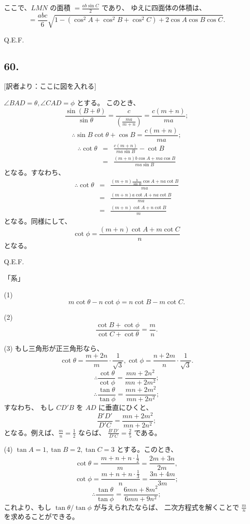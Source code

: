 ここで、$LMN$ の面積 $= \frac{ab \sin C}{2}$ であり、
ゆえに四面体の体積は、
\[
= \frac{abc}{6}
 \sqrt{1 - (\cos^2 A + \cos^2 B + \cos^2 C) + 2 \cos A \cos B \cos C}.
\]

Q.E.F.


\subsection*{60.}

[訳者より：ここに図を入れる] 

$\angle BAD = \theta, \angle CAD = \phi$ とする。
このとき、
\[
\frac{\sin (B + \theta)}{\sin \theta}
= \frac{c}{\left( \frac{ma}{m + n} \right)}
= \frac{c ( m + n)}{ma};
\]
\[
\therefore
\sin B \cot \theta + \cos B = \frac{c(m + n)}{ma};
\]
\begin{eqnarray*}
\therefore
\cot \theta
&=&
 \frac{c(m + n)}{ma \sin B} - \cot B\\
&=&
 \frac{(m+n)b \cos A + ma \cos B}{ma \sin B}
\end{eqnarray*}
となる。すなわち、
\begin{eqnarray*}
\therefore
\cot \theta
&=&
\frac{(m + n) \frac{b}{\sin B} \cos A + na \cot B}{ma}\\
&=&
\frac{(m + n) a \cot A + na \cot B}{ma}\\
&=&
\frac{(m + n)  \cot A + n \cot B}{m}
\end{eqnarray*}
となる。同様にして、
\[
\cot \phi = \frac{(m + n)  \cot A + m \cot C}{n}
\]
となる。

Q.E.F.

「系」

(1)
\[
m \cot \theta - n \cot \phi = n \cot B - m \cot C.
\]

(2)
\[
\frac{\cot B + \cot \phi}{\cot C + \cot \theta} = \frac{m}{n}.
\]

(3)
もし三角形が正三角形なら、
\[
\cot \theta = \frac{m + 2n}{m} \cdot \frac{1}{\sqrt{3}},
\cot \phi = \frac{n + 2m}{n} \cdot \frac{1}{\sqrt{3}}.
\]
\[
\therefore
\frac{\cot \theta}{\cot \phi} = \frac{mn + 2n^2}{mn + 2m^2};
\]
\[
\therefore
\frac{\tan \theta}{\tan \phi} = \frac{mn + 2m^2}{mn + 2n^2};
\]
すなわち、
もし $CD'B$ を $AD$ に垂直にひくと、
\[
\frac{B'D'}{D'C} = \frac{mn + 2m^2}{mn + 2n^2};
\]
となる。例えば、$\frac{m}{n} = \frac{1}{2}$ ならば、
$\frac{B'D'}{D'C} = \frac{2}{5}$ である。

(4)
$\tan A = 1,  \tan B = 2, \tan C = 3$ とする。このとき、
\[
\cot \theta = \frac{m + n + n \cdot \frac{1}{2}}{m}
 = \frac{2m + 3n}{2m},
\]
\[
\cot \phi = \frac{m + n + n \cdot \frac{1}{3}}{n}
 = \frac{3n + 4m}{3m};
\]
\[
\therefore
\frac{\tan \theta}{\tan \phi}
 = \frac{6mn + 8m^2}{6mn + 9n^2};
\]
これより、もし $\tan \theta / \tan \phi$ が与えられたならば、
二次方程式を解くことで $\frac{m}{n}$ を求めることができる。

